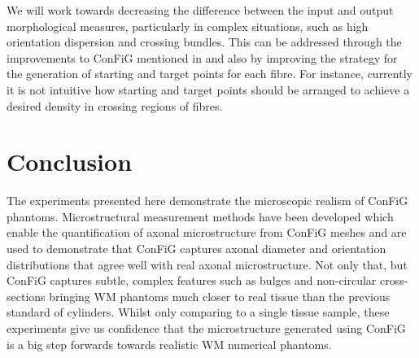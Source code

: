 We will work towards decreasing the difference between the input and output morphological measures, particularly in complex situations, such as high orientation dispersion and crossing bundles. This can be addressed through the improvements to \ac{ConFiG} mentioned in  and also by improving the strategy for the generation of starting and target points for each fibre. For instance, currently it is not intuitive how starting and target points should be arranged to achieve a desired density in crossing regions of fibres.


\section{Conclusion}
\label{sec:micro_conclusion}
The experiments presented here demonstrate the microscopic realism of \ac{ConFiG} phantoms. Microstructural measurement methods have been developed which enable the quantification of axonal microstructure from \ac{ConFiG} meshes and are used to demonstrate that \ac{ConFiG} captures axonal diameter and orientation distributions that agree well with real axonal microstructure.
Not only that, but \ac{ConFiG} captures subtle, complex features such as bulges and non-circular cross-sections bringing \ac{WM} phantoms much closer to real tissue than the previous standard of cylinders.
Whilst only comparing to a single tissue sample, these experiments give us confidence that the microstructure generated using \ac{ConFiG} is a big step forwards towards realistic \ac{WM} numerical phantoms. 


